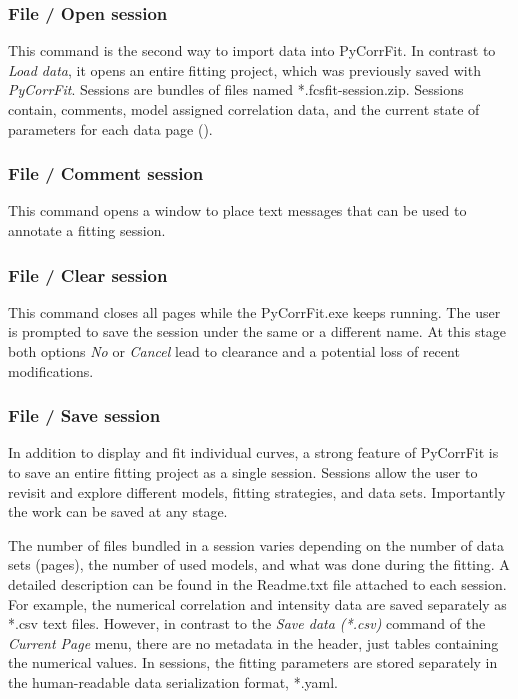 \subsubsection{File / Open session}
\label{sec:menub.filem.opens}
This command is the second way to import data into PyCorrFit. In contrast to \textit{Load data}, it opens an entire fitting project, which was previously saved with \textit{PyCorrFit}. Sessions are bundles of files named *.fcsfit-session.zip. Sessions contain, comments, model assigned correlation data, and the current state of parameters for each data page ().

\subsubsection{File / Comment session}
\label{sec:menub.filem.comme}
This command opens a window to place text messages that can be used to annotate a fitting session.

\subsubsection{File / Clear session}
\label{sec:menub.filem.clear}
This command closes all pages while the PyCorrFit.exe keeps running. The user is prompted to save the session under the same or a different name. At this stage both options \textit{No} or \textit{Cancel} lead to clearance and a potential loss of recent modifications.

\subsubsection{File / Save session}
\label{sec:menub.filem.saves}
In addition to display and fit individual curves, a strong feature of PyCorrFit is to save an entire fitting project as a single session. Sessions allow the user to revisit and explore different models, fitting strategies, and data sets. Importantly the work can be saved at any stage.

The number of files bundled in a session varies depending on the number of data sets (pages), the number of used models, and what was done during the fitting. A detailed description can be found in the Readme.txt file attached to each session. For example, the numerical correlation and intensity data are saved separately as *.csv text files. However, in contrast to the \textit{Save data (*.csv)} command of the \textit{Current Page} menu, there are no metadata in the header, just tables containing the numerical values. In sessions, the fitting parameters are stored separately in the human-readable data serialization format, *.yaml.

